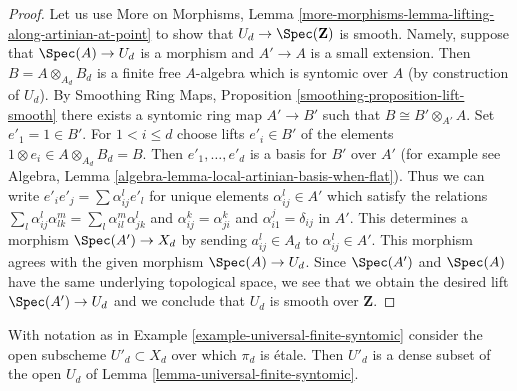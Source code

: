 \begin{proof}
Let us use More on Morphisms, Lemma
\ref{more-morphisms-lemma-lifting-along-artinian-at-point}
to show that $U_d \to \Spec(\mathbf{Z})$ is smooth.
Namely, suppose that $\Spec(A) \to U_d$ is a morphism
and $A' \to A$ is a small extension. Then $B = A \otimes_{A_d} B_d$
is a finite free $A$-algebra which is syntomic over $A$
(by construction of $U_d$). By
Smoothing Ring Maps, Proposition \ref{smoothing-proposition-lift-smooth}
there exists a syntomic ring map $A' \to B'$ such that
$B \cong B' \otimes_{A'} A$. Set $e'_1 = 1 \in B'$. For $1 < i \leq d$
choose lifts $e'_i \in B'$ of the elements
$1 \otimes e_i \in A \otimes_{A_d} B_d = B$. Then $e'_1, \ldots, e'_d$
is a basis for $B'$ over $A'$ (for example see Algebra, Lemma
\ref{algebra-lemma-local-artinian-basis-when-flat}).
Thus we can write $e'_i e'_j = \sum \alpha_{ij}^l e'_l$ for unique
elements $\alpha_{ij}^l \in A'$ which satisfy the relations
$\sum_l \alpha_{ij}^l \alpha_{lk}^m = \sum_l \alpha_{il}^m \alpha _{jk}^l$
and $\alpha_{ij}^k = \alpha_{ji}^k$ and $\alpha_{i1}^j = \delta_{ij}$
in $A'$. This determines a morphism $\Spec(A') \to X_d$ by
sending $a_{ij}^l \in A_d$ to $\alpha_{ij}^l \in A'$. This morphism
agrees with the given morphism $\Spec(A) \to U_d$. Since $\Spec(A')$
and $\Spec(A)$ have the same underlying topological space, we see
that we obtain the desired lift $\Spec(A') \to U_d$ and we
conclude that $U_d$ is smooth over $\mathbf{Z}$.
\end{proof}

\begin{lemma}
\label{lemma-universal-finite-syntomic-etale}
With notation as in Example \ref{example-universal-finite-syntomic}
consider the open subscheme $U'_d \subset X_d$ over which
$\pi_d$ is \'etale. Then $U'_d$ is a dense subset of the
open $U_d$ of Lemma \ref{lemma-universal-finite-syntomic}.
\end{lemma}

